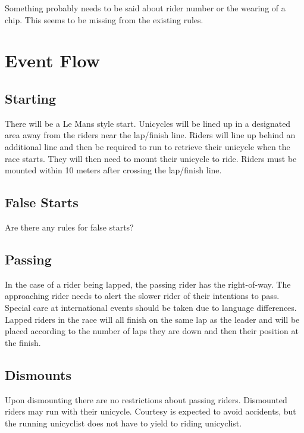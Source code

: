 \begin{framed}
Something probably needs to be said about rider number or the wearing of a chip.  This seems to be missing from the existing rules.
\end{framed}

\section{Event Flow}

\subsection{Starting}

There will be a Le Mans style start.
Unicycles will be lined up in a designated area away from the riders near the lap/finish line.
Riders will line up behind an additional line and then be required to run to retrieve their unicycle when the race starts.
They will then need to mount their unicycle to ride.
Riders must be mounted within 10 meters after crossing the lap/finish line.

\subsection{False Starts}

\begin{framed}
Are there any rules for false starts?
\end{framed}

\subsection{Passing}

In the case of a rider being lapped, the passing rider has the right-of-way.
The approaching rider needs to alert the slower rider of their intentions to pass.
Special care at international events should be taken due to language differences.
Lapped riders in the race will all finish on the same lap as the leader and will be placed according to the number of laps they are down and then their position at the finish.

\subsection{Dismounts}

Upon dismounting there are no restrictions about passing riders.
Dismounted riders may run with their unicycle.
Courtesy is expected to avoid accidents, but the running unicyclist does not have to yield to riding unicyclist.

